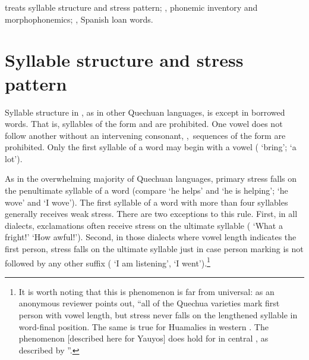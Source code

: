 { treats syllable structure and stress pattern; , phonemic inventory and morphophonemics; , Spanish loan words. 

\section{Syllable structure and stress pattern}\label{sec:syllabe structure}
Syllable structure in \SYQ, as in other Quechuan languages, is \pCpVpCp{} except in borrowed words. That is, syllables of the form \CCV{} and \VCC{} are prohibited. One vowel does not follow another without an intervening consonant, \ie,~sequences of the form \VV{} are prohibited. Only the first syllable of a word may begin with a vowel ( ‘bring’;  ‘a lot’). 

As in the overwhelming majority of Quechuan languages, primary stress falls on the penultimate syllable of a word (compare  ‘he helps’ and  ‘he is helping’;  ‘he wove’ and  ‘I wove’). The first syllable of a word with more than four syllables generally receives weak stress. There are two exceptions to this rule. First, in all dialects, exclamations often receive stress on the ultimate syllable ( ‘What a fright!’  ‘How awful!’). Second, in those dialects where vowel length indicates the first person, stress falls on the ultimate syllable just in case person marking is not followed by any other suffix ( ‘I am listening’,  ‘I went’).\footnote{It is worth noting that this is phenomenon is far from universal: as an anonymous reviewer points out, “all of the  Quechua varieties mark first person with vowel length, but stress never falls on the lengthened syllable in word-final position. The same is true for Huamalies in western . The phenomenon [described here for Yauyos] does hold for  in central , as described by \citet{Weber89}”.}

}
